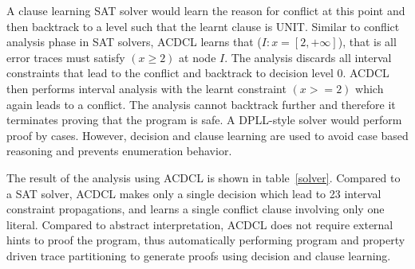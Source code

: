 A clause learning SAT solver would learn the reason for conflict at this 
point and then backtrack to a level such that the learnt clause is UNIT.  
Similar to conflict analysis phase in SAT solvers, ACDCL learns that 
(\(I: x = [2,+\infty]\)), that is all error traces must satisfy $(x \geq 2)$ 
at node $I$.  The analysis discards all interval constraints that
lead to the conflict and backtrack to decision level 0.  ACDCL then 
performs interval analysis with the learnt constraint $(x>=2)$ which again 
leads to a conflict.  The analysis cannot backtrack further and therefore 
it terminates proving that the program is safe.  A DPLL-style solver would 
perform proof by cases.  However, decision and clause learning are used 
to avoid case based reasoning and prevents enumeration behavior.     
   
The result of the analysis using ACDCL is shown in table~\ref{solver}.  
Compared to a SAT solver, ACDCL makes only a single decision which lead 
to 23 interval constraint propagations, and learns a single conflict clause 
involving only one literal.  Compared to abstract interpretation, ACDCL does 
not require external hints to proof the program, thus automatically performing 
program and property driven trace partitioning to generate proofs using decision 
and clause learning.  

